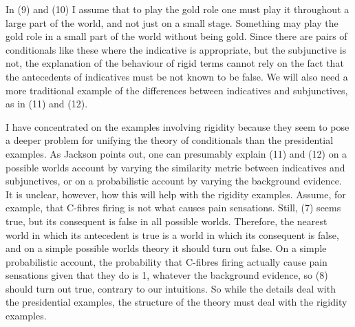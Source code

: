 
\noindent In (9) and (10) I assume that to play the gold role one must play it throughout a large part of the world, and not just on a small stage. Something may play the gold role in a small part of the world without being gold. Since there are pairs of conditionals like these where the indicative is appropriate, but the subjunctive is not, the explanation of the behaviour of rigid terms cannot rely on the fact that the antecedents of indicatives must be not known to be false. We will also need a more traditional example of the differences between indicatives and subjunctives, as in (11) and (12).


\noindent I have concentrated on the examples involving rigidity because they seem to pose a deeper problem for unifying the theory of conditionals than the presidential examples. As Jackson \citeyearpar[75]{Jackson1987} points out, one can presumably explain (11) and (12) on a possible worlds account by varying the similarity metric between indicatives and subjunctives, or on a probabilistic account by varying the background evidence. It is unclear, however, how this will help with the rigidity examples. Assume, for example, that C-fibres firing is not what causes pain sensations. Still, (7) seems true, but its consequent is false in all possible worlds. Therefore, the nearest world in which its antecedent is true is a world in which its consequent is false, and on a simple possible worlds theory it should turn out false. On a simple probabilistic account, the probability that C-fibres firing actually cause pain sensations given that they do is 1, whatever the background evidence, so (8) should turn out true, contrary to our intuitions. So while the details deal with the presidential examples, the structure of the theory must deal with the rigidity examples.

